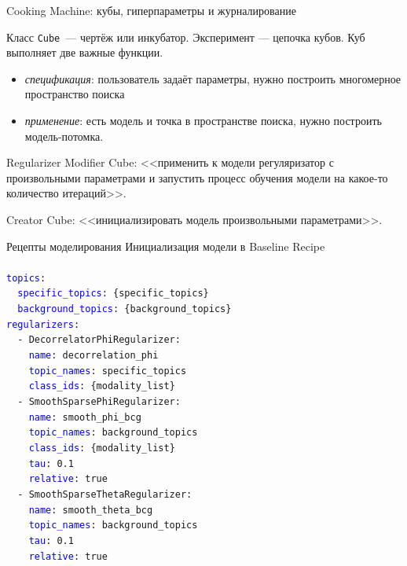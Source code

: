 \begin{frame}{Cooking Machine: кубы, гиперпараметры и журналирование}

Класс \texttt{Cube}~--- чертёж или инкубатор. Эксперимент --- цепочка кубов. Куб выполняет две важные функции.
\begin{itemize}
    \item \textit{спецификация}: пользователь задаёт параметры, нужно построить многомерное пространство поиска 
    \item \textit{применение}: есть модель и точка в пространстве поиска, нужно построить модель-потомка.
\end{itemize}

Regularizer Modifier Cube: <<применить к модели регуляризатор с произвольными параметрами и запустить процесс обучения модели на какое-то количество итераций>>.

Creator Cube: <<инициализировать модель произвольными параметрами>>.

\end{frame}

\begin{frame}[t]{Рецепты моделирования}
Инициализация модели в Baseline Recipe\\

\footnotesize \texttt{\\
\textcolor{blue}{topics}: \\
\ \ \textcolor{blue}{specific\_topics}: \colorbox{gray!30}{\{specific\_topics\}} \\
\ \     \textcolor{blue}{background\_topics}: \colorbox{gray!30}{\{background\_topics\}} \\
\textcolor{blue}{regularizers}: \\
\ \ - DecorrelatorPhiRegularizer: \\
\ \ \ \ \textcolor{blue}{name}: decorrelation\_phi \\
\ \ \ \ \textcolor{blue}{topic\_names}: specific\_topics \\
\ \ \ \ \textcolor{blue}{class\_ids}: \colorbox{gray!30}{\{modality\_list\}} \\
\ \ - SmoothSparsePhiRegularizer: \\
\ \ \ \ \textcolor{blue}{name}: smooth\_phi\_bcg \\
\ \ \ \ \textcolor{blue}{topic\_names}: background\_topics \\
\ \ \ \ \textcolor{blue}{class\_ids}: \colorbox{gray!30}{\{modality\_list\}} \\
\ \ \ \ \textcolor{blue}{tau}: 0.1 \\
\ \ \ \ \textcolor{blue}{relative}: true \\
\ \ - SmoothSparseThetaRegularizer: \\
\ \ \ \ \textcolor{blue}{name}: smooth\_theta\_bcg \\
\ \ \ \ \textcolor{blue}{topic\_names}: background\_topics \\
\ \ \ \ \textcolor{blue}{tau}: 0.1 \\
\ \ \ \ \textcolor{blue}{relative}: true \\
}

\end{frame}

